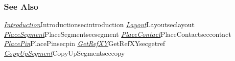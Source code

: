 \begin{htmlonly}
        
\subsubsection{See Also}

\hyperref[ref]{\emph{Introduction}}{}{Introduction}{secintroduction}
\hyperref[ref]{\emph{Layout}}{}{Layout}{seclayout}
\hyperref[ref]{\emph{PlaceSegment}}{}{PlaceSegment}{secsegment}
\hyperref[ref]{\emph{PlaceContact}}{}{PlaceContact}{seccontact}
\hyperref[ref]{\emph{PlacePin}}{}{PlacePin}{secpin}
\hyperref[ref]{\emph{GetRefXY}}{}{GetRefXY}{secgetref}
\hyperref[ref]{\emph{CopyUpSegment}}{}{CopyUpSegment}{seccopy}

\end{htmlonly}
